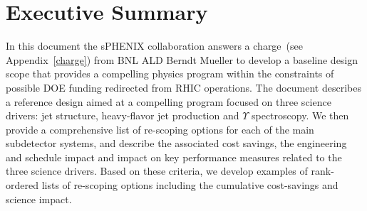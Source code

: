 \section*{Executive Summary}
\label{executive_summary}
\setcounter{page}{1}

\nocite{*}

In this document the sPHENIX collaboration answers a charge~(see
Appendix~\ref{charge}) from BNL ALD Berndt Mueller to develop
a baseline design scope that provides a compelling physics program
within the constraints of possible DOE funding redirected from 
RHIC operations. The document describes a reference design aimed
at a compelling program focused on three science drivers: jet structure,
heavy-flavor jet production and $\Upsilon$ spectroscopy. We then
provide a comprehensive list of re-scoping options for each
of the main subdetector systems, and describe the associated
cost savings, the engineering and schedule impact and impact on 
key performance measures related to the three science 
drivers. Based on these criteria, we develop examples of 
rank-ordered lists of re-scoping options including the 
cumulative cost-savings and science impact.


